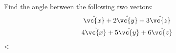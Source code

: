         Find the angle between the following two vectors:
        \begin{gather*}
          \hat{\vc{x}}+2\hat{\vc{y}}+3\hat{\vc{z}} \\
          4\hat{\vc{x}}+5\hat{\vc{y}}+6\hat{\vc{z}} 
        \end{gather*}
        <%
